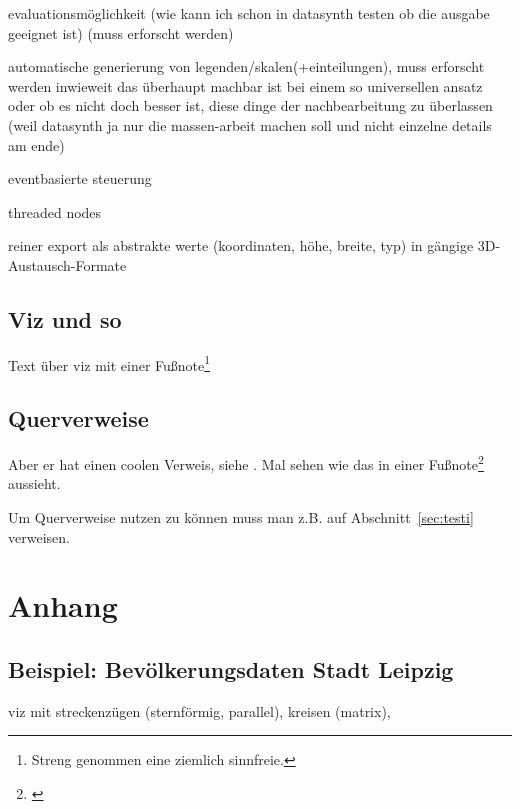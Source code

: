 \documentclass[a4paper, 12pt, onepage, pdftex, headsepline, footsepline]{scrreprt}
\begin{document}
evaluationsmöglichkeit (wie kann ich schon in datasynth testen ob die ausgabe geeignet ist) (muss erforscht werden)

automatische generierung von legenden/skalen(+einteilungen), muss erforscht werden inwieweit das überhaupt machbar ist bei einem so universellen ansatz oder ob es nicht doch besser ist, diese dinge der nachbearbeitung zu überlassen (weil datasynth ja nur die massen-arbeit machen soll und nicht einzelne details am ende)

eventbasierte steuerung

threaded nodes

reiner export als abstrakte werte (koordinaten, höhe, breite, typ) in gängige 3D-Austausch-Formate

\section*{Viz und so}

Text über viz mit einer Fußnote\footnote{Streng genommen eine ziemlich sinnfreie.}

\section*{Querverweise}

Aber er hat einen coolen Verweis, siehe \cite[S.\,35--38]{Visualisierung}.
Mal sehen wie das in einer Fußnote\footnote{\cite{Visualisierung}} aussieht.

Um Querverweise nutzen zu können muss man z.B. auf Abschnitt~\ref{sec:testi} verweisen.



\listoftables
\listoffigures
\chapter{Anhang}
\section{Beispiel: Bevölkerungsdaten Stadt Leipzig}
viz mit streckenzügen (sternförmig, parallel), kreisen (matrix),
\end{document}
